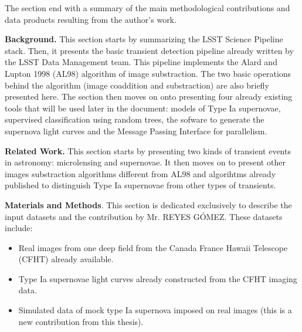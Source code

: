 \documentclass{article}
\begin{document}
The section end with a summary of the main methodological contributions and data products resulting from the author's work. 

{\bf Background.} This section starts by summarizing the
LSST Science Pipeline stack. Then, it presents the basic
transient detection pipeline already written by the LSST
Data Management team.
This pipeline implements the Alard and Lupton 1998 (AL98)
algorithm of image substraction. The two basic operations
behind the algorithm (image coaddition and substraction)
are also briefly presented here. The section then moves on
onto presenting four already existing  tools that will
be used later in the document: models of Type Ia
supernovae, supervised classification using random trees,
the sofware to generate the supernova light curves and the
Message Passing Interface for parallelism.

{\bf Related Work.} This section starts by presenting two kinds of transient events in astronomy: microlensing and supernovae. It then moves on to present other images substraction algorithms different from AL98 and algorihtms already published to distinguish Type Ia supernovae from other types of transients.

{\bf Materials and Methods}. This section is dedicated exclusively to describe the input datasets and the contribution by Mr. REYES G\'OMEZ. These datasets include:
\begin{itemize}
    \item Real images from one deep field from the Canada France Hawaii Telescope (CFHT) already available.
    \item Type Ia supernovae light curves already constructed from the CFHT imaging data.
    \item Simulated data of mock type Ia supernova imposed on real images (this is a new contribution from this thesis).
\end{itemize}
\end{document}

